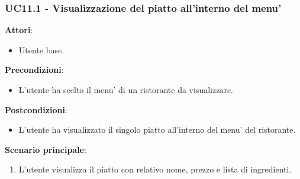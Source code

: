 \subsubsection{UC11.1 - Visualizzazione del piatto all'interno del menu'} \label{usecase:11_1}
\textbf{Attori}:
\begin{itemize}
    \item Utente base.
\end{itemize}
\textbf{Precondizioni}:
\begin{itemize}
    \item L'utente ha scelto il menu' di un ristorante da visualizzare.
\end{itemize}
\textbf{Postcondizioni}:
\begin{itemize}
    \item L'utente ha visualizzato il singolo piatto all'interno del menu' del ristorante.
\end{itemize}
\textbf{Scenario principale}:
\begin{enumerate}
    \item L'utente visualizza il piatto con relativo nome, prezzo e lista di ingredienti.
\end{enumerate}
\newpage